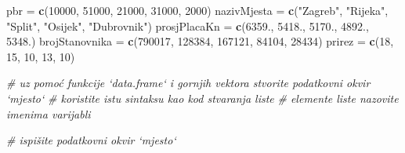 \documentclass[]{book}
\newenvironment{Shaded}{\begin{snugshade}}{\end{snugshade}}
\newcommand{\KeywordTok}[1]{\textcolor[rgb]{0.13,0.29,0.53}{\textbf{#1}}}
\newcommand{\DecValTok}[1]{\textcolor[rgb]{0.00,0.00,0.81}{#1}}
\newcommand{\StringTok}[1]{\textcolor[rgb]{0.31,0.60,0.02}{#1}}
\newcommand{\CommentTok}[1]{\textcolor[rgb]{0.56,0.35,0.01}{\textit{#1}}}
\newcommand{\NormalTok}[1]{#1}
\theoremstyle{definition}
\theoremstyle{definition}
\theoremstyle{definition}
\theoremstyle{remark}
\begin{document}
\begin{Shaded}
\begin{Highlighting}[]
\NormalTok{pbr =}\StringTok{ }\KeywordTok{c}\NormalTok{(}\DecValTok{10000}\NormalTok{, }\DecValTok{51000}\NormalTok{, }\DecValTok{21000}\NormalTok{, }\DecValTok{31000}\NormalTok{, }\DecValTok{2000}\NormalTok{)}
\NormalTok{nazivMjesta =}\StringTok{ }\KeywordTok{c}\NormalTok{(}\StringTok{"Zagreb"}\NormalTok{, }\StringTok{"Rijeka"}\NormalTok{, }\StringTok{"Split"}\NormalTok{, }\StringTok{"Osijek"}\NormalTok{, }\StringTok{"Dubrovnik"}\NormalTok{)}
\NormalTok{prosjPlacaKn =}\StringTok{ }\KeywordTok{c}\NormalTok{(}\DecValTok{6359}\NormalTok{., }\DecValTok{5418}\NormalTok{., }\DecValTok{5170}\NormalTok{., }\DecValTok{4892}\NormalTok{., }\DecValTok{5348}\NormalTok{.)}
\NormalTok{brojStanovnika =}\StringTok{ }\KeywordTok{c}\NormalTok{(}\DecValTok{790017}\NormalTok{, }\DecValTok{128384}\NormalTok{, }\DecValTok{167121}\NormalTok{, }\DecValTok{84104}\NormalTok{, }\DecValTok{28434}\NormalTok{)}
\NormalTok{prirez =}\StringTok{ }\KeywordTok{c}\NormalTok{(}\DecValTok{18}\NormalTok{, }\DecValTok{15}\NormalTok{, }\DecValTok{10}\NormalTok{, }\DecValTok{13}\NormalTok{, }\DecValTok{10}\NormalTok{)}

\CommentTok{# uz pomoć funkcije `data.frame` i gornjih vektora stvorite podatkovni okvir `mjesto`}
\CommentTok{# koristite istu sintaksu kao kod stvaranja liste}
\CommentTok{# elemente liste nazovite imenima varijabli}


\CommentTok{# ispišite podatkovni okvir `mjesto`}
\end{Highlighting}
\end{Shaded}
\end{document}
